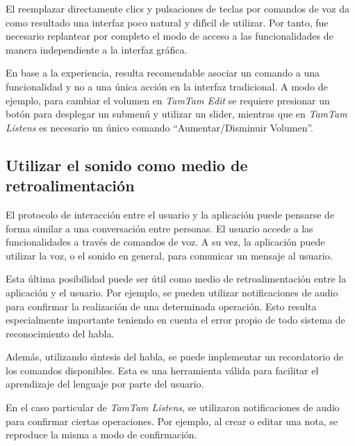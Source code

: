 El reemplazar directamente clics y pulsaciones de teclas por comandos de voz da
como resultado una interfaz poco natural y dif{\'\i}cil de utilizar. Por tanto, fue
necesario replantear por completo el modo de acceso a las funcionalidades de manera
independiente a la interfaz gr\'afica.

En base a la experiencia, resulta recomendable asociar un comando a una funcionalidad
y no a una \'unica acci\'on en la interfaz tradicional. A modo de ejemplo, para cambiar el
volumen en \emph{TamTam Edit} se requiere presionar un bot\'on para desplegar un submen\'u 
y utilizar un {slider}, mientras que en \emph{TamTam Listens} es necesario un
\'unico comando ``Aumentar/Disminuir Volumen''.

\subsection{Utilizar el sonido como medio de retroalimentaci\'on}
El protocolo de interacci\'on entre el usuario y la aplicaci\'on puede pensarse de forma similar a una 
conversaci\'on entre personas. El usuario accede a las funcionalidades a trav\'es de comandos de voz.
A su vez, la aplicaci\'on puede utilizar la voz, o el sonido en general, para comunicar un mensaje al usuario.

Esta \'ultima posibilidad puede ser \'util como medio de retroalimentaci\'on entre la aplicaci\'on y el usuario.
Por ejemplo, se pueden utilizar notificaciones de audio para confirmar la realizaci\'on de una determinada
operaci\'on. Esto resulta especialmente importante teniendo en cuenta el error propio de todo sistema
de reconocimiento del habla.

Adem\'as, utilizando s{\'\i}ntesis del habla, se puede implementar un recordatorio de los comandos
disponibles. Esta es una herramienta v\'alida para facilitar el aprendizaje del lenguaje por parte del
usuario.

En el caso particular de \emph{TamTam Listens}, se utilizaron notificaciones de audio para confirmar
ciertas operaciones. Por ejemplo, al crear o editar una nota, se reproduce la misma a modo de
confirmaci\'on.


